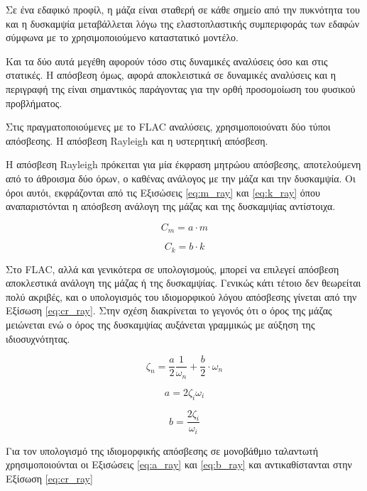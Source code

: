 Σε ένα εδαφικό προφίλ, η μάζα είναι σταθερή σε κάθε σημείο από την πυκνότητα του και η δυσκαμψία μεταβάλλεται λόγω της ελαστοπλαστικής συμπεριφοράς των εδαφών σύμφωνα με το χρησιμοποιούμενο καταστατικό μοντέλο.

Και τα δύο αυτά μεγέθη αφορούν τόσο στις δυναμικές αναλύσεις όσο και στις στατικές. Η απόσβεση όμως, αφορά αποκλειστικά σε δυναμικές αναλύσεις και η περιγραφή της είναι σημαντικός παράγοντας για την ορθή προσομοίωση του φυσικού προβλήματος.

Στις πραγματοποιούμενες με το FLAC αναλύσεις, χρησιμοποιούνατι δύο τύποι απόσβεσης. Η απόσβεση Rayleigh και η υστερητική απόσβεση.

Η απόσβεση Rayleigh πρόκειται για μία έκφραση μητρώου απόσβεσης, αποτελούμενη από το άθροισμα δύο όρων, ο καθένας ανάλογος με την μάζα και την δυσκαμψία. Οι όροι αυτόι, εκφράζονται από τις Εξισώσεις \ref{eq:m_ray} και \ref{eq:k_ray} όπου αναπαριστόνται η απόσβεση ανάλογη της μάζας και της δυσκαμψίας αντίστοιχα.

\begin{equation}
	C_m = a\cdot m
	\label{eq:m_ray}
\end{equation}

\begin{equation}
	C_k = b\cdot k
	\label{eq:k_ray}
\end{equation}

Στο FLAC, αλλά και γενικότερα σε υπολογισμούς, μπορεί να επιλεγεί απόσβεση αποκλεστικά ανάλογη της μάζας ή της δυσκαμψίας. Γενικώς κάτι τέτοιο δεν θεωρείται πολύ ακριβές, και ο υπολογισμός του ιδιομορφικού λόγου απόσβεσης γίνεται από την Εξίσωση \ref{eq:cr_ray}. Στην σχέση διακρίνεται το γεγονός ότι ο όρος της μάζας μειώνεται ενώ ο όρος της δυσκαμψίας αυξάνεται γραμμικώς με αύξηση της ιδιοσυχνότητας.

\begin{equation}
	\zeta_n = \frac{a}{2}\frac{1}{\omega_n}+\frac{b}{2}\cdot \omega_n
	\label{eq:cr_ray}
\end{equation}

\begin{equation}
	a = 2\zeta_i\omega_i
	\label{eq:a_ray}
\end{equation}

\begin{equation}
	b = \frac{2\zeta_i}{\omega_i}
	\label{eq:b_ray}
\end{equation}

Για τον υπολογισμό της ιδιομορφικής απόσβεσης σε μονοβάθμιο ταλαντωτή χρησιμοποιούνται οι Εξισώσεις \ref{eq:a_ray} και \ref{eq:b_ray} και αντικαθίστανται στην Εξίσωση \ref{eq:cr_ray} \parencite{Chopra}

